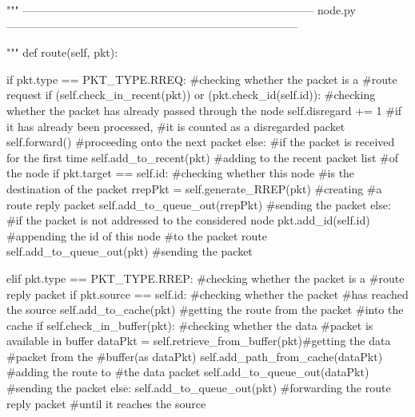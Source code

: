 \documentclass[a4paper,11pt]{article}%
\begin{document}
\begin{python}
	"""
	    ------------------------------------------------------------------------------
	    node.py
	    ------------------------------------------------------------------------------

	"""
	def route(self, pkt):

		 if pkt.type == PKT_TYPE.RREQ:    #checking whether the packet is a
																			#route request
				 if (self.check_in_recent(pkt)) or (pkt.check_id(self.id)):
					#checking whether the packet has already passed through the node
						 self.disregard += 1  #if it has already been processed,
																	#it is counted as a disregarded packet
						 self.forward()   #proceeding onto the next packet
				 else:    #if the packet is received for the first time
						 self.add_to_recent(pkt)      #adding to the recent packet list
																					#of the node
						 if pkt.target == self.id:    #checking whether this node
																					#is the destination of the packet
								 rrepPkt = self.generate_RREP(pkt)    #creating
																											#a route reply packet
								 self.add_to_queue_out(rrepPkt)   #sending the packet
						 else:    #if the packet is not addressed to the considered node
								 pkt.add_id(self.id)     #appending the id of this node
																				 #to the packet route
								 self.add_to_queue_out(pkt)   #sending the packet

		 elif pkt.type == PKT_TYPE.RREP:  #checking whether the packet is a
																			#route reply packet
				 if pkt.source == self.id:    #checking whether the packet
																			#has reached the source
						 self.add_to_cache(pkt)   #getting the route from the packet
																			#into the cache
						 if self.check_in_buffer(pkt):    #checking whether the data
																							#packet is available in buffer
								 dataPkt = self.retrieve_from_buffer(pkt)#getting the data
																												 #packet from the
																												 #buffer(as dataPkt)
								 self.add_path_from_cache(dataPkt)    #adding the route to
																											#the data packet
								 self.add_to_queue_out(dataPkt)   #sending the packet
				 else:
						 self.add_to_queue_out(pkt)   #forwarding the route reply packet
																					#until it reaches the source


\end{python}
\end{document}
